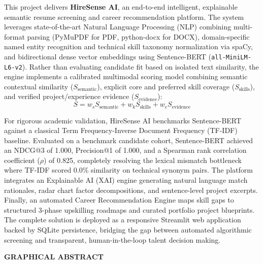 \documentclass[12pt,a4paper]{report}
\begin{document}
This project delivers \textbf{HireSense AI}, an end-to-end intelligent, explainable semantic resume screening and career recommendation platform. The system leverages state-of-the-art Natural Language Processing (NLP) combining multi-format parsing (PyMuPDF for PDF, python-docx for DOCX), domain-specific named entity recognition and technical skill taxonomy normalization via spaCy, and bidirectional dense vector embeddings using Sentence-BERT (\texttt{all-MiniLM-L6-v2}). Rather than evaluating candidate fit based on isolated text similarity, the engine implements a calibrated multimodal scoring model combining semantic contextual similarity ($S_{\text{semantic}}$), explicit core and preferred skill coverage ($S_{\text{skills}}$), and verified project/experience evidence ($S_{\text{evidence}}$):
\begin{equation}
S = w_s S_{\text{semantic}} + w_k S_{\text{skills}} + w_e S_{\text{evidence}} \nonumber
\end{equation}

For rigorous academic validation, HireSense AI benchmarks Sentence-BERT against a classical Term Frequency-Inverse Document Frequency (TF-IDF) baseline. Evaluated on a benchmark candidate cohort, Sentence-BERT achieved an NDCG@3 of 1.000, Precision@1 of 1.000, and a Spearman rank correlation coefficient ($\rho$) of 0.825, completely resolving the lexical mismatch bottleneck where TF-IDF scored 0.0\% similarity on technical synonym pairs. The platform integrates an Explainable AI (XAI) engine generating natural language match rationales, radar chart factor decompositions, and sentence-level project excerpts. Finally, an automated Career Recommendation Engine maps skill gaps to structured 3-phase upskilling roadmaps and curated portfolio project blueprints. The complete solution is deployed as a responsive Streamlit web application backed by SQLite persistence, bridging the gap between automated algorithmic screening and transparent, human-in-the-loop talent decision making.

\newpage
{}
\begin{center}
    {\Large \textbf{GRAPHICAL ABSTRACT}}
\end{center}
\vspace{0.6cm}
\end{document}
